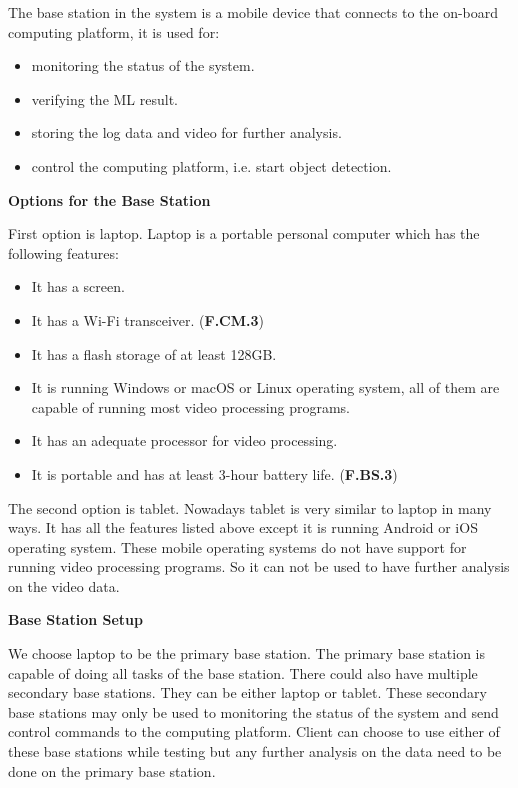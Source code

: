 The base station in the system is a mobile device that connects to the on-board computing platform, it is used for:
\begin{itemize}
    \item monitoring the status of the system.
    \item verifying the ML result.
    \item storing the log data and video for further analysis.
    \item control the computing platform, i.e. start object detection.
\end{itemize}

\textbf{Options for the Base Station}

First option is laptop. Laptop is a portable personal computer which has the following features:
\begin{itemize}
    \item It has a screen.
    \item It has a Wi-Fi transceiver. (\textbf{F.CM.3})
    \item It has a flash storage of at least 128GB.
    \item It is running Windows or macOS or Linux operating system, all of them are capable of running most video processing programs.
    \item It has an adequate processor for video processing.
    \item It is portable and has at least 3-hour battery life. (\textbf{F.BS.3})
\end{itemize}

The second option is tablet. Nowadays tablet is very similar to laptop in many ways. It has all the features listed above except it is running Android or iOS operating system. These mobile operating systems do not have support for running video processing programs. So it can not be used to have further analysis on the video data.

\textbf{Base Station Setup}

We choose laptop to be the primary base station. The primary base station is capable of doing all tasks of the base station. There could also have multiple secondary base stations. They can be either laptop or tablet. These secondary base stations may only be used to monitoring the status of the system and send control commands to the computing platform. Client can choose to use either of these base stations while testing but any further analysis on the data need to be done on the primary base station.

